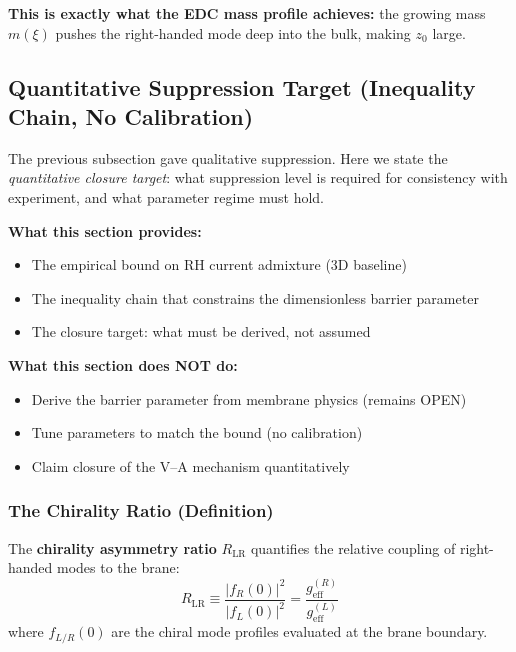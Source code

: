 \textbf{This is exactly what the EDC mass profile achieves:} the growing mass
$m(\xi)$ pushes the right-handed mode deep into the bulk, making $z_0$ large.

\subsection{Quantitative Suppression Target (Inequality Chain, No Calibration)}
\label{subsec:va_inequality_chain}

The previous subsection gave qualitative suppression. Here we state the
\emph{quantitative closure target}: what suppression level is required for
consistency with experiment, and what parameter regime must hold.

\begin{tcolorbox}[colback=yellow!5!white, colframe=yellow!60!black,
    title=\textbf{Epistemic Status: Closure Target, Not Calibration}]
\label{box:va_inequality_status}

\textbf{What this section provides:}
\begin{itemize}[nosep]
    \item The empirical bound on RH current admixture (3D baseline)
    \item The inequality chain that constrains the dimensionless barrier parameter
    \item The closure target: what must be derived, not assumed
\end{itemize}

\textbf{What this section does NOT do:}
\begin{itemize}[nosep]
    \item Derive the barrier parameter from membrane physics (remains OPEN)
    \item Tune parameters to match the bound (no calibration)
    \item Claim closure of the V--A mechanism quantitatively
\end{itemize}
\end{tcolorbox}

\subsubsection{The Chirality Ratio (Definition)}

\begin{definition}
\label{def:va:RLR}
\tagDef{}
The \textbf{chirality asymmetry ratio} $R_{\text{LR}}$ quantifies the relative
coupling of right-handed modes to the brane:
\begin{equation}
    R_{\text{LR}} \equiv \frac{|f_R(0)|^2}{|f_L(0)|^2}
    = \frac{g_{\text{eff}}^{(R)}}{g_{\text{eff}}^{(L)}}
    \label{eq:va:RLR_def}
\end{equation}
where $f_{L/R}(0)$ are the chiral mode profiles evaluated at the brane boundary.
\end{definition}

